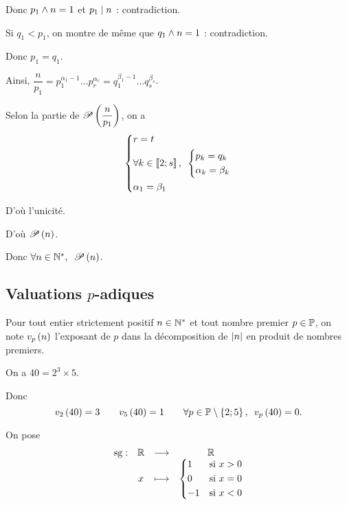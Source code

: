 \begin{dem}
Donc \(p_1\et n=1\) et \(p_1\divise n\) : contradiction.

Si \(q_1<p_1\), on montre de même que \(q_1\et n=1\) : contradiction.

Donc \(p_1=q_1\).

Ainsi, \(\dfrac{n}{p_1}=p_1^{\alpha_1-1}\dots p_r^{\alpha_r}=q_1^{\beta_1-1}\dots q_s^{\beta_s}\).

Selon la partie \unicite de \(\P{\dfrac{n}{p_1}}\), on a \[\begin{dcases}r=t \\ \quantifs{\forall k\in\interventierii{2}{s}}\begin{dcases}p_k=q_k \\ \alpha_k=\beta_k\end{dcases} \\ \alpha_1=\beta_1\end{dcases}\]

D'où l'unicité.

D'où \(\P{n}\).

Donc \(\quantifs{\forall n\in\Ns}\P{n}\).
\end{dem}

\subsection{Valuations \(p\)-adiques}

\begin{defi}
Pour tout entier strictement positif \(n\in\Ns\) et tout nombre premier \(p\in\prem\), on note \(\valp{p}{n}\) l'exposant de \(p\) dans la décomposition de \(\abs{n}\) en produit de nombres premiers.
\end{defi}

\begin{ex}
On a \(40=2^3\times5\).

Donc \[\valp{2}{40}=3\qquad\valp{5}{40}=1\qquad\quantifs{\forall p\in\prem\excluant\accol{2;5}}\valp{p}{40}=0.\]
\end{ex}

\begin{nota}
On pose \[\fonction{\sg}{\R}{\R}{x}{\begin{dcases}1 &\text{si }x>0 \\ 0 &\text{si }x=0 \\ -1 &\text{si }x<0\end{dcases}}\]
\end{nota}

